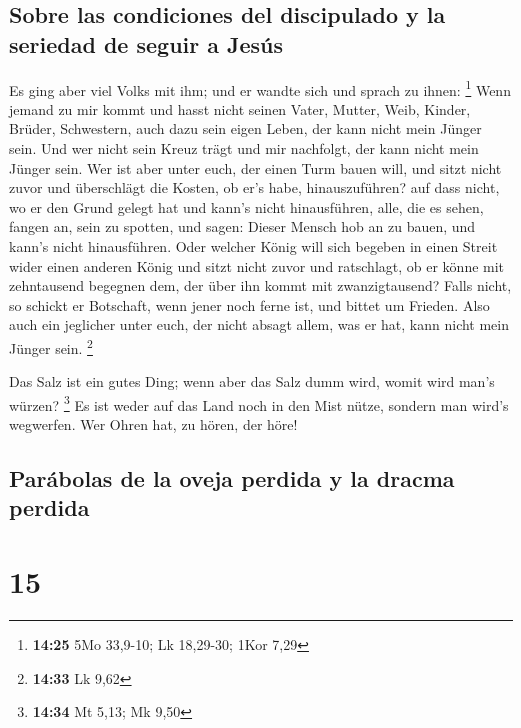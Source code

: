 \hypertarget{sobre-las-condiciones-del-discipulado-y-la-seriedad-de-seguir-a-jesuxfas}{%
\subsection{Sobre las condiciones del discipulado y la seriedad de
seguir a
Jesús}\label{sobre-las-condiciones-del-discipulado-y-la-seriedad-de-seguir-a-jesuxfas}}

 Es ging aber viel Volks mit ihm; und er wandte sich und
sprach zu ihnen: \footnote{\textbf{14:25} 5Mo 33,9-10; Lk 18,29-30; 1Kor
  7,29}  Wenn jemand zu mir kommt und hasst nicht seinen
Vater, Mutter, Weib, Kinder, Brüder, Schwestern, auch dazu sein eigen
Leben, der kann nicht mein Jünger sein.  Und wer nicht
sein Kreuz trägt und mir nachfolgt, der kann nicht mein Jünger sein.
 Wer ist aber unter euch, der einen Turm bauen will, und
sitzt nicht zuvor und überschlägt die Kosten, ob er's habe,
hinauszuführen?  auf dass nicht, wo er den Grund gelegt
hat und kann's nicht hinausführen, alle, die es sehen, fangen an, sein
zu spotten,  und sagen: Dieser Mensch hob an zu bauen,
und kann's nicht hinausführen.  Oder welcher König will
sich begeben in einen Streit wider einen anderen König und sitzt nicht
zuvor und ratschlagt, ob er könne mit zehntausend begegnen dem, der über
ihn kommt mit zwanzigtausend?  Falls nicht, so schickt er
Botschaft, wenn jener noch ferne ist, und bittet um Frieden.
 Also auch ein jeglicher unter euch, der nicht absagt
allem, was er hat, kann nicht mein Jünger sein. \footnote{\textbf{14:33}
  Lk 9,62}

 Das Salz ist ein gutes Ding; wenn aber das Salz dumm
wird, womit wird man's würzen? \footnote{\textbf{14:34} Mt 5,13; Mk 9,50}
 Es ist weder auf das Land noch in den Mist nütze,
sondern man wird's wegwerfen. Wer Ohren hat, zu hören, der höre!

\hypertarget{paruxe1bolas-de-la-oveja-perdida-y-la-dracma-perdida}{%
\subsection{Parábolas de la oveja perdida y la dracma
perdida}\label{paruxe1bolas-de-la-oveja-perdida-y-la-dracma-perdida}}

\hypertarget{section-14}{%
\section{15}\label{section-14}}

